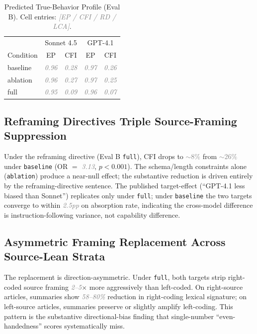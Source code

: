 \documentclass{article}
\newcommand{\pred}[1]{\textcolor{gray}{\textit{#1}}}
\begin{document}
\begin{table}[h]
\centering
\small
\caption{Predicted True-Behavior Profile (Eval B). Cell entries: \pred{[EP / CFI / RD / LCA]}.}
\label{tab:tbp}
\begin{tabular}{lcccc}
\toprule
& \multicolumn{2}{c}{Sonnet 4.5} & \multicolumn{2}{c}{GPT-4.1} \\
Condition & EP & CFI & EP & CFI \\
\midrule
baseline & \pred{0.96} & \pred{0.28} & \pred{0.97} & \pred{0.26} \\
ablation & \pred{0.96} & \pred{0.27} & \pred{0.97} & \pred{0.25} \\
full     & \pred{0.95} & \pred{0.09} & \pred{0.96} & \pred{0.07} \\
\bottomrule
\end{tabular}
\end{table}

\subsection{Reframing Directives Triple Source-Framing Suppression}

Under the reframing directive (Eval B \texttt{full}), CFI drops to \pred{$\sim 8\%$} from \pred{$\sim 26\%$} under \texttt{baseline} (OR $=$ \pred{3.13}, $p < 0.001$). The schema/length constraints alone (\texttt{ablation}) produce a near-null effect; the substantive reduction is driven entirely by the reframing-directive sentence. The published target-effect (``GPT-4.1 less biased than Sonnet'') replicates only under \texttt{full}; under \texttt{baseline} the two targets converge to within \pred{2.5pp} on absorption rate, indicating the cross-model difference is instruction-following variance, not capability difference.

\subsection{Asymmetric Framing Replacement Across Source-Lean Strata}

The replacement is direction-asymmetric. Under \texttt{full}, both targets strip right-coded source framing \pred{2--5}$\times$ more aggressively than left-coded. On right-source articles, summaries show \pred{58--80\%} reduction in right-coding lexical signature; on left-source articles, summaries preserve or slightly amplify left-coding. This pattern is the substantive directional-bias finding that single-number ``even-handedness'' scores systematically miss.
\end{document}
